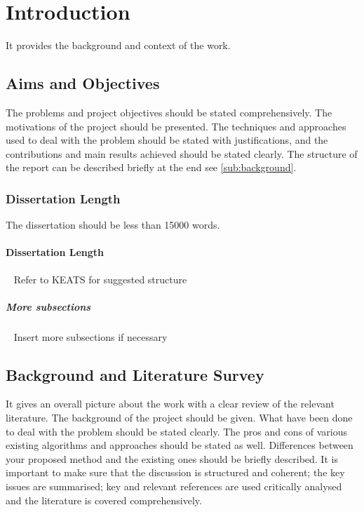 
\section{Introduction}
It provides the background and context of the work.

\subsection{Aims and Objectives} 
The problems and project objectives should be stated comprehensively. The motivations of the project should be presented. The techniques and approaches used to deal with the problem should be stated with justifications, and the contributions and main results achieved should be stated clearly. The structure of the report can be described briefly at the end see \autoref{sub:background}.

\subsubsection{Dissertation Length}
	The dissertation should be less than 15000 words.
	
\paragraph{Dissertation Length}~\newline
	Refer to KEATS for suggested structure
	
\noindent \subparagraph{More subsections}~\newline
	Insert more subsections if necessary
	

\subsection{Background and Literature Survey} \label{sub:background}
 It gives an overall picture about the work with a clear review of the relevant literature.  The background of the project should be given.  What have been done to deal with the problem should be stated clearly.  The pros and cons of various existing algorithms and approaches should be stated as well.  Differences between your proposed method and the existing ones should be briefly described. It is important to make sure that the discussion is structured and coherent; the key issues are summarised; key and relevant references are used critically analysed and the literature is covered comprehensively.

